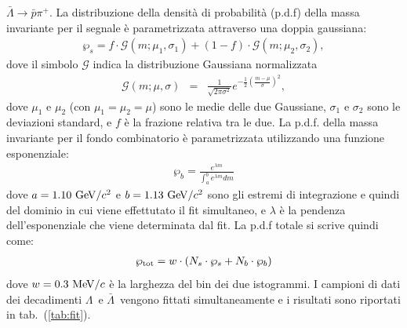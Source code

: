 \documentclass[a4paper,10pt]{article}
\newcommand{\antiproton}{\ensuremath{\bar{p}}}
\newcommand{\lambdazero}{\ensuremath{\Lambda}}
\newcommand{\alambdazero}{\ensuremath{\bar{\Lambda}}}
\newcommand{\alambdazeroppi}{\ensuremath{\bar{\lambdazero} \to \antiproton \pi^+}}
\newcommand{\pdf}{\ensuremath{\wp}}
\newcommand{\gev}{\ensuremath{\mathrm{Ge\kern -0.1em V}}}	%
\newcommand{\mev}{\ensuremath{\mathrm{Me\kern -0.1em V}}}	%
\newcommand{\massgev}{\mbox{\gev/$c^2$}}			%
\newcommand{\pmev}{\mbox{\mev/$c$}}				%
\begin{document}
\alambdazeroppi. 
La distribuzione della densit\`a di probabilit\`a  (p.d.f) della massa invariante  per il segnale \`e parametrizzata attraverso 
una doppia gaussiana:
\begin{eqnarray}
\pdf_{s} = f \cdot \mathcal{G}(m;\mu_1, \sigma_{1} ) + (1 - f)\cdot \mathcal{G}(m;\mu_2, \sigma_{2} ),
\end{eqnarray}
dove il simbolo $\mathcal{G}$ indica la distribuzione Gaussiana normalizzata
\begin{eqnarray}
\mathcal{G}(m;\mu, \sigma ) & = & \frac{1}{\sqrt{2\pi\sigma^{2}}} e^{-\frac{1}{2}\left( \frac{m-\mu}{\sigma} \right)^{2}},
\end{eqnarray}
dove $\mu_1$ e  $\mu_2$  (con $\mu_1=\mu_2=\mu$) sono le medie delle due Gaussiane, $\sigma_1$ e $\sigma_2$ sono le 
deviazioni standard, e $f$ \`e la frazione relativa tra le due.
La p.d.f. della massa invariante per il fondo combinatorio \`e parametrizzata utilizzando una funzione esponenziale:
\begin{eqnarray}
\pdf_{b} =  \frac{e^{\lambda m}}{ \int_{a}^{b} e^{\lambda m} dm} %
\end{eqnarray}
dove $a=1.10~\massgev$ e $b=1.13~\massgev$ sono gli estremi di integrazione e quindi del dominio in cui viene 
effettutato il fit simultaneo, e $\lambda$ \`e la pendenza dell'esponenziale che viene determinata dal fit.
La p.d.f totale si scrive quindi come:
\begin{eqnarray}
\pdf_{\rm tot} = w\cdot \left(N_{s}\cdot \pdf_{s} + N_{b}\cdot \pdf_{b}\right)
\end{eqnarray}
dove $w=0.3~\pmev$ \`e la larghezza del bin dei due istogrammi.
I campioni di dati dei decadimenti \lambdazero\ e \alambdazero\ vengono fittati simultaneamente e i risultati sono riportati in tab.~(\ref{tab:fit}).
\end{document}
